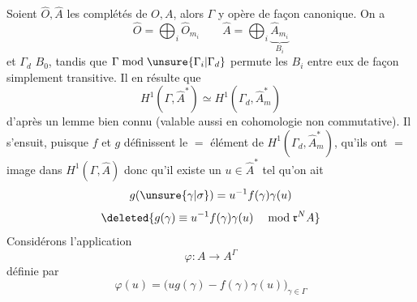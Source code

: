 Soient $\widehat{O},\widehat{A}$ les complétés de $O,A$, alors $\Gamma$ y opère de façon canonique. On a
\[
\widehat{O}=\bigoplus_i\widehat{O}_{m_i}\qquad\widehat{A}=\bigoplus_i\underbrace{\widehat{A}_{m_i}}_{B_i}
\]
et $\Gamma_d$  $B_0$, tandis que $\Gamma\bmod\unsure{\Gamma_i|\Gamma_d}$ permute les $B_i$ entre eux de façon simplement transitive. Il en résulte que
\[
H^1(\Gamma,\widehat{A}^*)\simeq H^1(\Gamma_d,\widehat{A}_m^*)
\]
d'après un lemme bien connu (valable aussi en cohomologie non commutative). Il s'ensuit, puisque $f$ et $g$ définissent le $=$ élément de $H^1(\Gamma_d,\widehat{A}_m^*)$,  \inserted{[on regarde le diagramme commutatif}
\inserted{]} qu'ils ont $=$ image dans $H^1(\Gamma,\widehat{A})$ donc qu'il existe un $u\in\widehat{A}^*$ tel qu'on ait
\[
g(\unsure{\gamma|\sigma})=u^{-1}f(\gamma)\gamma(u)
\]
\[
\deleted{g(\gamma)\equiv u^{-1}f(\gamma)\gamma(u)\quad\bmod\mathfrak r^N A}
\]
Considérons l'application 
\[
\varphi:A\longrightarrow A^\Gamma
\]
définie par
\[
\varphi(u)=\bigl(ug(\gamma)-f(\gamma)\gamma(u)\bigr)_{\gamma\in\Gamma}
\]
